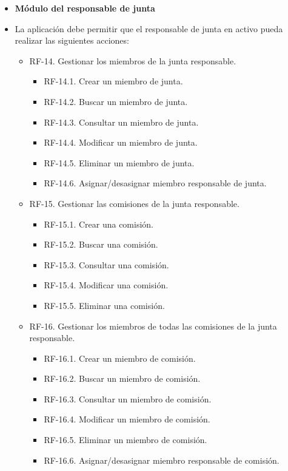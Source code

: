 \begin{itemize}
\item \textbf{Módulo del responsable de junta}
 \item[] La aplicación debe permitir que el responsable de junta en activo pueda realizar las siguientes acciones:
     \begin{itemize}
        \item RF-14. Gestionar los miembros de la junta responsable.
             \begin{itemize}
                  \item RF-14.1. Crear un miembro de junta.
                  \item RF-14.2. Buscar un miembro de junta.
                  \item RF-14.3. Consultar un miembro de junta.
                  \item RF-14.4. Modificar un miembro de junta.
                  \item RF-14.5. Eliminar un miembro de junta.
                  \item RF-14.6. Asignar/desasignar miembro responsable de junta.
             \end{itemize}  
         \item RF-15. Gestionar las  comisiones de la junta responsable.
             \begin{itemize}
                  \item RF-15.1. Crear una comisión.
                  \item RF-15.2. Buscar una comisión.
                  \item RF-15.3. Consultar una comisión.
                  \item RF-15.4. Modificar una comisión.
                  \item RF-15.5. Eliminar una comisión.
             \end{itemize}    
          \item RF-16. Gestionar los miembros de todas las comisiones de la junta responsable.
             \begin{itemize}
                  \item RF-16.1. Crear un miembro de comisión.
                  \item RF-16.2. Buscar un miembro de comisión.
                  \item RF-16.3. Consultar un miembro de comisión.
                  \item RF-16.4. Modificar un miembro de comisión.
                  \item RF-16.5. Eliminar un miembro de comisión.
                  \item RF-16.6. Asignar/desasignar miembro responsable de comisión.
             \end{itemize} 
             

\end{itemize}
\end{itemize}
